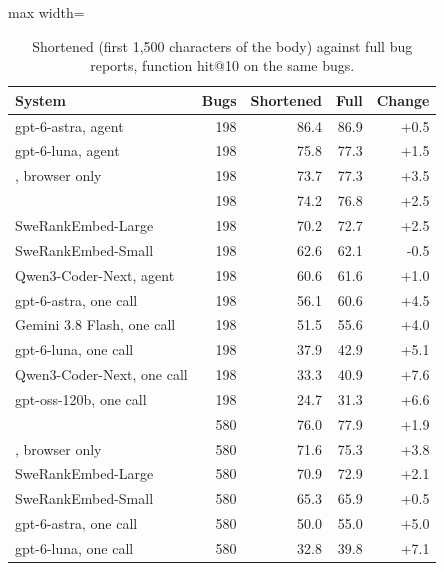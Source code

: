 \begin{table}[t]
\centering
\small
\caption{Shortened (first 1,500 characters of the body) against full bug reports, function hit@10 on the same bugs.}
\label{tab:conditions}
\begin{adjustbox}{max width=\linewidth}\begin{tabular}{lrrrr}
\toprule
System & Bugs & Shortened & Full & Change \\
\midrule
gpt-6-astra, agent & 198 & 86.4 & 86.9 & +0.5 \\
gpt-6-luna, agent & 198 & 75.8 & 77.3 & +1.5 \\
\tool{}, browser only & 198 & 73.7 & 77.3 & +3.5 \\
\toolgpu{} & 198 & 74.2 & 76.8 & +2.5 \\
SweRankEmbed-Large & 198 & 70.2 & 72.7 & +2.5 \\
SweRankEmbed-Small & 198 & 62.6 & 62.1 & -0.5 \\
Qwen3-Coder-Next, agent & 198 & 60.6 & 61.6 & +1.0 \\
gpt-6-astra, one call & 198 & 56.1 & 60.6 & +4.5 \\
Gemini 3.8 Flash, one call & 198 & 51.5 & 55.6 & +4.0 \\
gpt-6-luna, one call & 198 & 37.9 & 42.9 & +5.1 \\
Qwen3-Coder-Next, one call & 198 & 33.3 & 40.9 & +7.6 \\
gpt-oss-120b, one call & 198 & 24.7 & 31.3 & +6.6 \\
\toolgpu{} & 580 & 76.0 & 77.9 & +1.9 \\
\tool{}, browser only & 580 & 71.6 & 75.3 & +3.8 \\
SweRankEmbed-Large & 580 & 70.9 & 72.9 & +2.1 \\
SweRankEmbed-Small & 580 & 65.3 & 65.9 & +0.5 \\
gpt-6-astra, one call & 580 & 50.0 & 55.0 & +5.0 \\
gpt-6-luna, one call & 580 & 32.8 & 39.8 & +7.1 \\
\bottomrule
\end{tabular}\end{adjustbox}
\end{table}
